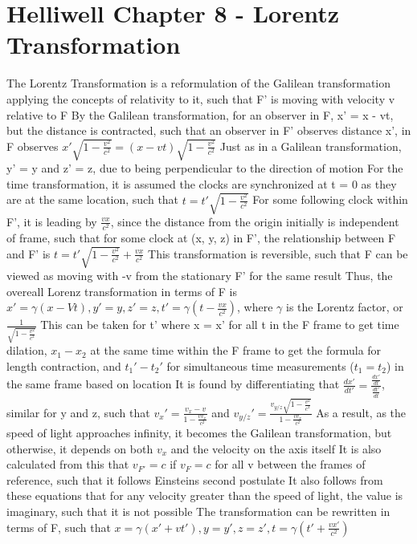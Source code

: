 \documentclass[11 pt, twoside]{article}
\newenvironment{outline*}
{
	\begin{outline}[enumerate]
	}
	{\end{outline}
}
\begin{document}
\section{Helliwell Chapter 8 - Lorentz Transformation}
\begin{outline*}
\1 The Lorentz Transformation is a reformulation of the Galilean transformation applying the concepts of relativity to it, such that F' is moving with velocity v relative to F
\2 By the Galilean transformation, for an observer in F, x' = x - vt, but the distance is contracted, such that an observer in F' observes distance x', in F observes $x'\sqrt{1 - \frac{v^2}{c^2}} = (x - vt)\sqrt{1 - \frac{v^2}{c^2}}$
\2 Just as in a Galilean transformation, y' = y and z' = z, due to being perpendicular to the direction of motion
\2 For the time transformation, it is assumed the clocks are synchronized at t = 0 as they are at the same location, such that $t = t'\sqrt{1 - \frac{v^2}{c^2}}$ 
\3 For some following clock within F', it is leading by $\frac{vx}{c^2}$, since the distance from the origin initially is independent of frame, such that for some clock at (x, y, z) in F', the relationship between F and F' is $t = t'\sqrt{1 - \frac{v^2}{c^2}} + \frac{vx}{c^2}$
\2 This transformation is reversible, such that F can be viewed as moving with -v from the stationary F' for the same result
\1 Thus, the overeall Lorenz transformation in terms of F is $x' = \gamma (x - Vt), y' = y, z' = z, t' = \gamma (t - \frac{vx}{c^2})$, where $\gamma$ is the Lorentz factor, or $\frac{1}{\sqrt{1 - \frac{v^2}{c^2}}}$
\1 This can be taken for t' where x = x' for all t in the F frame to get time dilation, $x_1 - x_2$ at the same time within the F frame to get the formula for length contraction, and $t_1' - t_2'$ for simultaneous time measurements ($t_1 = t_2$) in the same frame based on location
\1 It is found by differentiating that $\frac{dx'}{dt'} = \frac{\frac{dx'}{dt}}{\frac{dt'}{dt}}$, similar for y and z, such that $v_x' = \frac{v_x - v}{1 - \frac{vv_x}{c^2}}$ and $v_{y/z}' = \frac{v_{y/z}\sqrt{1 - \frac{v^2}{c^2}}}{1 - \frac{vv_x}{c^2}}$
\2 As a result, as the speed of light approaches infinity, it becomes the Galilean transformation, but otherwise, it depends on both $v_x$ and the velocity on the axis itself
\2 It is also calculated from this that $v_{F'} = c$ if $v_F = c$ for all v between the frames of reference, such that it follows Einsteins second postulate
\2 It also follows from these equations that for any velocity greater than the speed of light, the value is imaginary, such that it is not possible
\1 The transformation can be rewritten in terms of F, such that $x = \gamma (x' + vt'), y = y', z = z', t = \gamma(t' + \frac{vx'}{c^2})$
\end{outline*}
\end{document}
